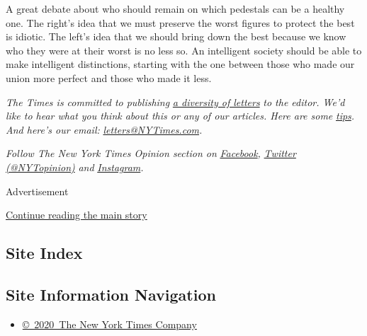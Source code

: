 A great debate about who should remain on which pedestals can be a
healthy one. The right's idea that we must preserve the worst figures to
protect the best is idiotic. The left's idea that we should bring down
the best because we know who they were at their worst is no less so. An
intelligent society should be able to make intelligent distinctions,
starting with the one between those who made our union more perfect and
those who made it less.

\emph{The Times is committed to publishing}
\href{https://www.nytimes3xbfgragh.onion/2019/01/31/opinion/letters/letters-to-editor-new-york-times-women.html}{\emph{a
diversity of letters}} \emph{to the editor. We'd like to hear what you
think about this or any of our articles. Here are some}
\href{https://help.nytimes3xbfgragh.onion/hc/en-us/articles/115014925288-How-to-submit-a-letter-to-the-editor}{\emph{tips}}\emph{.
And here's our email:}
\href{mailto:letters@NYTimes.com}{\emph{letters@NYTimes.com}}\emph{.}

\emph{Follow The New York Times Opinion section on}
\href{https://www.facebookcorewwwi.onion/nytopinion}{\emph{Facebook}}\emph{,}
\href{http://twitter.com/NYTOpinion}{\emph{Twitter (@NYTopinion)}}
\emph{and}
\href{https://www.instagram.com/nytopinion/}{\emph{Instagram}}\emph{.}

Advertisement

\protect\hyperlink{after-bottom}{Continue reading the main story}

\hypertarget{site-index}{%
\subsection{Site Index}\label{site-index}}

\hypertarget{site-information-navigation}{%
\subsection{Site Information
Navigation}\label{site-information-navigation}}

\begin{itemize}
\tightlist
\item
  \href{https://help.nytimes3xbfgragh.onion/hc/en-us/articles/115014792127-Copyright-notice}{©~2020~The
  New York Times Company}
\end{itemize}

